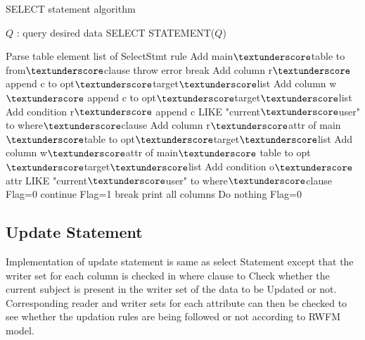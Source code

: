 \documentclass[11pt,a4paper]{report}
\begin{document}
\begin{algorithm}[H]
\caption{SELECT statement algorithm}
\renewcommand{\algorithmicrequire}{\textbf{Inputs:}}
\begin{algorithmic}[1]
\REQUIRE $Q$ : query
\ENSURE desired data
\STATE SELECT STATEMENT($Q$)  

  \STATE Parse table element list of SelectStmt rule
  \STATE Add main$\textunderscore$table to from$\textunderscore$clause
   \STATE throw error
   \STATE break
   \ELSE
   \STATE Add column r$\textunderscore$ append c to  opt$\textunderscore$target$\textunderscore$list
   \STATE Add column w$\textunderscore$ append c to opt$\textunderscore$target$\textunderscore$list
   \STATE Add condition r$\textunderscore$ append c LIKE "current$\textunderscore$user" to where$\textunderscore$clause
   \ENDIF
  \ENDFOR
  \STATE Add column r$\textunderscore$attr of main$\textunderscore$table to opt$\textunderscore$target$\textunderscore$list
  \STATE Add column w$\textunderscore$attr of main$\textunderscore$ table to opt$\textunderscore$target$\textunderscore$list
  \STATE Add condition o$\textunderscore$attr LIKE "current$\textunderscore$user" to where$\textunderscore$clause
  \STATE Flag=0
   \STATE continue
   \ELSE
    \STATE Flag=1
   \STATE break
  \ENDIF
  \ENDFOR
   \STATE print all columns
   \ELSE 
    \STATE Do nothing
    \STATE Flag=0
 \ENDIF
\end{algorithmic}
\end{algorithm}



\subsection{Update Statement}
 Implementation of update statement is same as select 
 Statement except that the writer set for each column is checked in where clause to Check whether the current subject is present in the writer set of the data to be Updated or not.   Corresponding reader and writer sets for each attribute can then be checked to see whether the updation rules are being followed or not according to RWFM model.  
\end{document}
